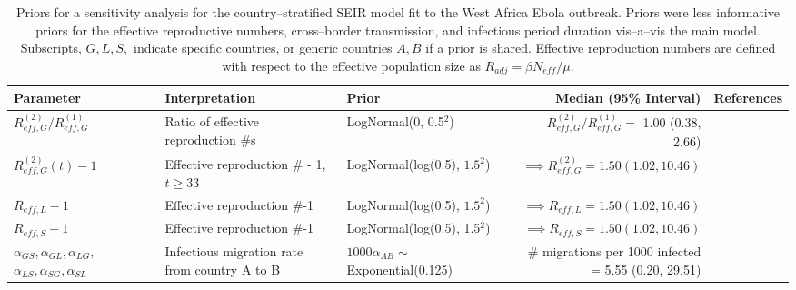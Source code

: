 \begin{table}
	\begin{fullpage}
		\caption[Loose priors used in a sensitivity analysis for a stratified SEIR model for Ebola in West Africa.]{Priors for a sensitivity analysis for the country--stratified SEIR model fit to the West Africa Ebola outbreak. Priors were less informative priors for the effective reproductive numbers, cross--border transmission, and infectious period duration vis--a--vis the main model. Subscripts, $ G,L,S, $ indicate specific countries, or generic countries $ A,B $ if a prior is shared. Effective reproduction numbers are defined with respect to the effective population size as $ R_{adj} = \beta N_{eff} /\mu $.}
		\label{tab:ebola_priors_joint_diffuse}
		\scriptsize
		\centering
		\begin{tabular}{lllrr}
			\hline
			\textbf{Parameter} &  \textbf{Interpretation} & \textbf{Prior} & \textbf{Median (95\% Interval)} & \textbf{References} \\ \hline
			$ R_{eff,G}^{(2)} / R_{eff,G}^{(1)} $ & Ratio of effective reproduction \#s &  LogNormal(0, 0.5$ ^2 $) & $ R_{eff,G}^{(2)} / R_{eff,G}^{(1)} = $ 1.00 (0.38, 2.66) & \cite{chowell2014transmission,chretien2015mathematical,coltart2017ebola,king2015avoidable} \\
			$ R_{eff,G}^{(2)}(t)-1 $ & Effective reproduction \# - 1, $ t\geq33 $ & LogNormal(log(0.5), $ 1.5^2 $) & $ \implies R_{eff,G}^{(2)} = 1.50 (1.02, 10.46)$ &  \cite{chowell2014transmission,chretien2015mathematical,coltart2017ebola,king2015avoidable} \\
			$ R_{eff,L} -1 $ & Effective reproduction \#-1 &  LogNormal(log(0.5), $ 1.5^2 $) & $ \implies R_{eff,L} = 1.50 (1.02, 10.46)$ &  \cite{chowell2014transmission,chretien2015mathematical,coltart2017ebola,king2015avoidable} \\
			$ R_{eff,S}-1 $ & Effective reproduction \#-1 & LogNormal(log(0.5), 1.5$ ^2 $) & $ \implies R_{eff,S} = 1.50 (1.02, 10.46)$ &  \cite{chowell2014transmission,chretien2015mathematical,coltart2017ebola,king2015avoidable}\\
			\makecell[l]{$ \alpha_{GS},\alpha_{GL}, \alpha_{LG},$\\
				$ \alpha_{LS},\alpha_{SG}, \alpha_{SL} $} & \makecell[l]{Infectious migration rate \\ from country A to B} & $ 1000\alpha_{AB} \sim$ Exponential(0.125) & \makecell[r]{\# migrations per 1000 infected \\ = 5.55 (0.20, 29.51)} & \cite{dudas2017virus}\\ 

\end{tabular}
\end{fullpage}
\end{table}
